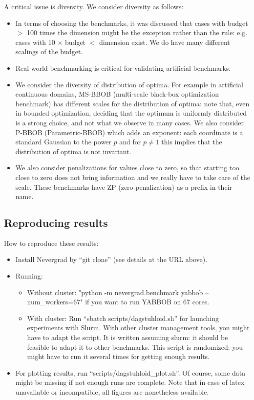 \documentclass{article}
\begin{document}
A critical issue is diversity. We consider diversity as follows:
\begin{itemize}
\item In terms of choosing the benchmarks, it was discussed that cases with budget $>$ 100 times the dimension might be
the exception rather than the rule: e.g. cases with 10 $\times$ budget $<$ dimension exist. We do have many different
scalings of the budget.
\item Real-world benchmarking is critical for validating artificial benchmarks. 
\item We consider the diversity of distribution of optima. For example in artificial continuous domains, MS-BBOB
(multi-scale black-box optimization benchmark) has
different scales for the distribution of optima: note that, even in bounded optimization, deciding that the optimum is
uniformly distributed is a strong choice, and not what we observe in many cases. We also consider P-BBOB
(Parametric-BBOB) which adds an exponent: each coordinate is a standard Gaussian to the power $p$ and for $p\neq 1$ this
implies that the distribution of optima is not invariant.
\item We also consider penalizations for values close to zero, so that starting too close to zero does not bring
information and we really have to take care of the scale. These benchmarks have ZP (zero-penalization) as a prefix in
their name.
\end{itemize}

\subsection{Reproducing results}
How to reproduce these results:
\begin{itemize}
\item Install Nevergrad by “git clone” (see details at the URL above).
\item  Running:
\begin{itemize}
\item Without cluster: "python -m nevergrad.benchmark yabbob --num\_workers=67" if you want to run YABBOB on 67 cores. 
\item With cluster: Run “sbatch scripts/dagstuhloid.sh” for launching experiments with Slurm. With other cluster management tools, you might have to adapt the script. It is written assuming slurm: it should be feasible to adapt it to other benchmarks. This script is randomized: you might have to run it several times for getting enough results.
\end{itemize}
\item For plotting results, run “scripts/dagstuhloid\_plot.sh”. Of course, some data might be missing if not enough runs are complete. Note that in case of latex unavailable or incompatible, all figures are nonetheless available.
\end{itemize}
\end{document}
